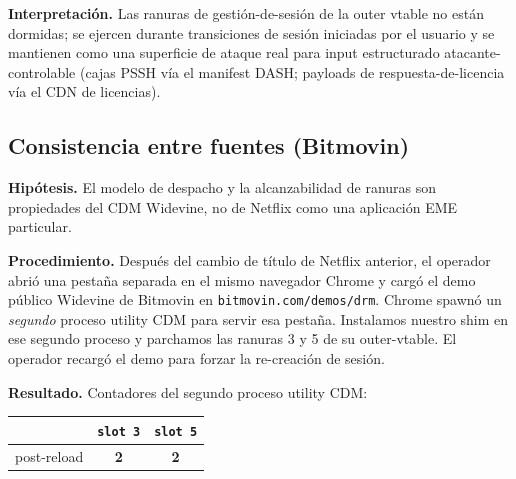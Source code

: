 \documentclass[11pt,letterpaper]{article}
\begin{document}
\textbf{Interpretación.} Las ranuras de gestión-de-sesión de la
outer vtable no están dormidas; se ejercen durante transiciones
de sesión iniciadas por el usuario y se mantienen como una
superficie de ataque real para input estructurado
atacante-controlable (cajas PSSH vía el manifest DASH; payloads
de respuesta-de-licencia vía el CDN de licencias).

\subsection{Consistencia entre fuentes (Bitmovin)}
\label{sec:findings-cross}

\textbf{Hipótesis.} El modelo de despacho y la alcanzabilidad de
ranuras son propiedades del CDM Widevine, no de Netflix como una
aplicación EME particular.

\textbf{Procedimiento.} Después del cambio de título de Netflix
anterior, el operador abrió una pestaña separada en el mismo
navegador Chrome y cargó el demo público Widevine de Bitmovin en
\texttt{bitmovin.com/demos/drm}. Chrome spawnó un \emph{segundo}
proceso utility CDM para servir esa pestaña. Instalamos nuestro
shim en ese segundo proceso y parchamos las ranuras 3 y 5 de su
outer-vtable. El operador recargó el demo para forzar la
re-creación de sesión.

\textbf{Resultado.} Contadores del segundo proceso utility CDM:

\begin{center}\small
\begin{tabular}{lcc}
\toprule
& \texttt{slot 3} & \texttt{slot 5} \\
\midrule
post-reload & \textbf{2} & \textbf{2} \\
\bottomrule
\end{tabular}
\end{center}
\end{document}
